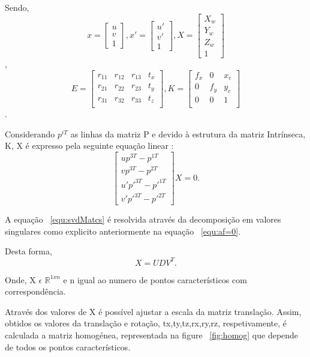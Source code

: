 Sendo, \[ x =  \left[ \begin{array}{ccc} u \\ v \\ 1 \end{array} \right],  x' =  \left[ \begin{array}{ccc} u' \\ v' \\ 1 \end{array} \right] ,  X =  \left[ \begin{array}{cccc} X_w \\ Y_w \\ Z_w \\ 1 \end{array} \right] \], \[ E =  \left[ \begin{array}{cccc} r_{11} & r_{12} & r_{13} & t_{x} \\ r_{21} & r_{22} & r_{23} & t_{y} \\ r_{31} & r_{32} & r_{33} & t_{z} \\ \end{array} \right] , K =  \left[ \begin{array}{ccc} f_x & 0 & x_c \\ 0 & f_y & y_c \\ 0 & 0 & 1 \\ \end{array} \right] \].

Considerando $p^{iT}$ as linhas da matriz P e devido à estrutura da matriz Intrínseca, K, X é expresso pela seguinte equação linear :  \begin{equation}\label{equ:svdMatcs} 
\left[ \begin{array}{cccc}
up^{3T} - p^{1T} \\
vp^{3T} - p^{2T} \\
u'p'^{3T} - p'^{1T} \\
v'p'^{3T} - p'^{2T} 
\end{array} \right] X = 0 .
\end{equation}

A equação ~\ref{equ:svdMatcs} é resolvida através da decomposição em valores singulares como explicito anteriormente na equação ~\ref{equ:af=0}.

Desta forma, \[ X = UDV^T. \] 

Onde, X $\epsilon$ $\mathbb{R}^{1xn}$ e n igual ao numero de pontos característicos com correspondência.

Através dos valores de X é possível ajustar a escala da matriz translação. Assim, obtidos os valores da translação e rotação, tx,ty,tz,rx,ry,rz, respetivamente, é calculada a matriz homogénea, representada na figure ~\ref{fig:homog} que depende de todos os pontos característicos.

